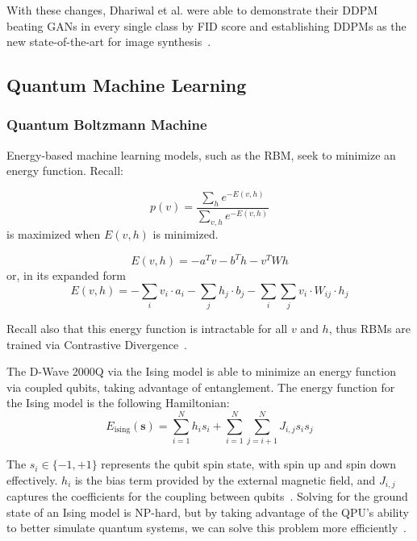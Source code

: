 \documentclass[technologies,article,accept,pdftex,moreauthors]{Definitions/mdpi}
\begin{document}
With these changes, Dhariwal et al. were able to demonstrate their DDPM beating GANs in every single class by FID score and establishing DDPMs as the new state-of-the-art for image synthesis~\cite{dhariwal2021diffusion}.

\subsection{Quantum Machine Learning}
\subsubsection{Quantum Boltzmann Machine}
Energy-based machine learning models, such as the RBM, seek to minimize an energy function. Recall:

\begin{equation}
p(v) = \frac{\sum_{h} e^{-E(v,h)}}{\sum_{v,h}e^{-E(v,h)}}
\end{equation}
is maximized when $E(v,h)$ is minimized.

\begin{equation}
E(v, h) = -a^Tv -b^Th -v^TWh
\end{equation}
or, in its expanded form
\begin{equation}
E(v, h) = - \sum_{i} v_i \cdot a_i - \sum_{j} h_j \cdot b_j - \sum_{i} \sum_{j} v_i \cdot W_{ij} \cdot h_j
\end{equation}

Recall also that this energy function is intractable for all $v$ and $h$, thus RBMs are trained via Contrastive Divergence~\cite{trainingrbms}.

The D-Wave 2000Q via the Ising model is able to minimize an energy function via coupled qubits, taking advantage of entanglement. The energy function for the Ising model is the following {Hamiltonian}: 
\begin{equation}
E_{\text{ising}}(\mathbf{s}) = \sum_{i=1}^N h_i s_i + \sum_{i=1}^N \sum_{j=i+1}^N J_{i,j} s_i s_j
\end{equation}



The $s_i \in \{-1, +1\}$ represents the qubit spin state, with spin up and spin down effectively. $h_i$ is the bias term provided by the external magnetic field, and $J_{i,j}$ captures the coefficients for the coupling between qubits~\cite{dwavedocs}. Solving for the ground state of an Ising model is NP-hard, but by taking advantage of the QPU's ability to better simulate quantum systems, we can solve this problem more efficiently~\cite{monte}.
\end{document}

